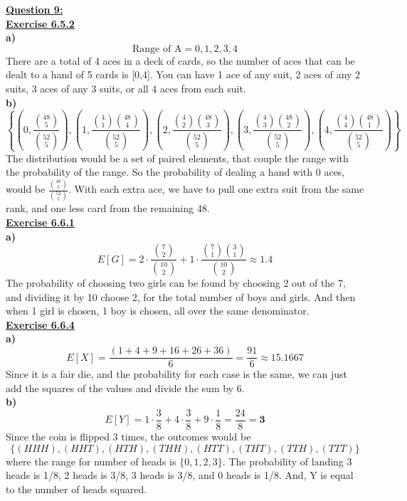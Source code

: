 \documentclass[12pt, letterpaper, twoside]{article}
\begin{document}
\newpage\noindent\textbf{\underline{Question 9:}}\\
\textbf{\underline{Exercise 6.5.2}}\\
\break
\textbf{a)}\\
\[\text{Range of A} = {0, 1, 2, 3, 4}\]
\indent There are a total of 4 aces in a deck of cards, so the number of aces that can be dealt to a hand of 5 cards is [0,4]. You can have 1 ace of any suit, 2 aces of any 2 suits, 3 aces of any 3 suits, or all 4 aces from each suit.\\
\break
\textbf{b)}\\
\[\left\{
    \left(0, \frac{\binom{48}{5}}{\binom{52}{5}}\right),
    \left(1, \frac{\binom{4}{1}\binom{48}{4}}{\binom{52}{5}}\right),
    \left(2, \frac{\binom{4}{2}\binom{48}{3}}{\binom{52}{5}}\right),
    \left(3, \frac{\binom{4}{3}\binom{48}{2}}{\binom{52}{5}}\right),
    \left(4, \frac{\binom{4}{4}\binom{48}{1}}{\binom{52}{5}}\right)
\right\}\]
\indent The distribution would be a set of paired elements, that couple the range with the probability of the range. So the probability of dealing a hand with 0 aces, would be $\frac{\binom{48}{5}}{\binom{52}{5}}$. With each extra ace, we have to pull one extra suit from the same rank, and one less card from the remaining 48.\\
\break
\textbf{\underline{Exercise 6.6.1}}\\
\break
\textbf{a)}\\
\[E[G] = 2 \cdot \frac{\binom{7}{2}}{\binom{10}{2}} + 1 \cdot \frac{\binom{7}{1}\binom{3}{1}}{\binom{10}{2}} \mathbf{\approx 1.4}\]
\indent The probability of choosing two girls can be found by choosing 2 out of the 7, and dividing it by 10 choose 2, for the total number of boys and girls. And then when 1 girl is chosen, 1 boy is chosen, all over the same denominator.\\
\break
\textbf{\underline{Exercise 6.6.4}}\\
\break
\textbf{a)}\\
\[E[X] = \frac{(1 + 4 + 9 + 16 + 26 + 36)}{6} = \frac{91}{6} \mathbf{\approx 15.1667}\]
\indent Since it is a fair die, and the probability for each case is the same, we can just add the squares of the values and divide the sum by 6.\\
\break
\newpage\noindent\textbf{b)}\\
\[E[Y] = 1\cdot\frac{3}{8} + 4\cdot\frac{3}{8} + 9\cdot\frac{1}{8} = \frac{24}{8} \mathbf{= 3}\]
\indent Since the coin is flipped 3 times, the outcomes would be $$\{(HHH), (HHT), (HTH), (THH), (HTT), (THT), (TTH), (TTT)\}$$ where the range for number of heads is $\{0, 1, 2, 3\}$. The probability of landing 3 heads is 1/8, 2 heads is 3/8, 3 heads is 3/8, and 0 heads is 1/8. And, Y is equal to the number of heads squared. \\
\end{document}
